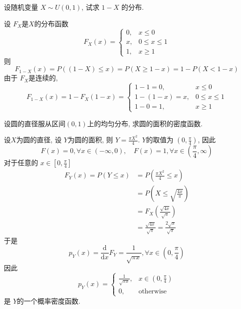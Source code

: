 \documentclass[../main.tex]{subfiles}
\begin{document}
\begin{exercise}{}{}
设随机变量 $X \sim U(0,1)$, 试求 $1-X$ 的分布.
\end{exercise}
\begin{solution}
   设 \(  F_{X}  \)是\(  X  \)的分布函数\[
   F_{X}\left( x \right)= \begin{cases} 0,& x \le 0\\ 
    x,& 0\le x\le 1\\ 
     1,& x\ge 1 \end{cases}  
   \] 则   \[
 F_{1-X}\left( x \right)=   P\left( \left( 1-X \right)\le x  \right)= P\left( X\ge 1-x \right)= 1-P\left( X< 1-x \right)   
  \]由于 \( F_{X}  \)是连续的, \[
  F_{1-X}\left( x \right)= 1- F_{X}\left( 1-x \right)  = \begin{cases} 1-1= 0,&x\le 0\\ 
   1-\left( 1-x \right)= x,& 0\le x\le 1\\ 
    1-0=  1,& x\ge 1  \end{cases} 
  \]
\end{solution}

\begin{exercise}{}{}
设圆的直径服从区间$(0,1)$上的均匀分布, 求圆的面积的密度函数.
\end{exercise}
\begin{solution}
  设\(  X  \)为圆的直径, 设 \(  Y  \)为圆的面积, 则 \(  Y= \frac{ \pi X^{2} }{4 }   \).  \(  Y  \)的取值为 \(  \left( 0, \frac{ \pi  }{4 }  \right)   \), 因此 \[
  F\left( x \right)= 0, \forall  x\in \left( -\infty,0 \right)  ,\quad F\left( x \right)= 1, \forall x \in \left( \frac{ \pi  }{4 },\infty  \right)  
  \] 对于任意的 \(  x\in [0,\frac{ \pi  }{4 } ]  \)  \[
 \begin{aligned}
  F_{Y}\left( x \right)= P\left( Y\le x \right)&= P\left( \frac{ \pi X^{2} }{4 }\le x  \right)   \\ 
   &= P\left( X\le \sqrt{\frac{4x }{ \pi  } } \right) \\ 
    &= F_{X}\left( \frac{\sqrt{4x} }{\sqrt{ \pi }  }  \right) \\ 
     &= \frac{\sqrt{4x} }{ \sqrt{ \pi }  } = \frac{2 \sqrt{x} }{ \sqrt{ \pi }  } 
 \end{aligned}
  \]   于是 \[
  p_{Y}\left( x \right)= \frac{\mathrm{d}}{\mathrm{d}x} F_{Y}= \frac{1 }{\sqrt{ \pi x} },\forall x\in \left( 0,\frac{ \pi  }{4 }  \right)  
  \] 因此 \[
  p_{Y}\left( x \right)= \begin{cases} \frac{1 }{\sqrt{ \pi x} }, &x\in \left( 0,\frac{ \pi  }{4 }  \right)   \\ 
   0,& \text{otherwise}\end{cases}  
  \]是 \(  Y  \)的一个概率密度函数. 
\end{solution}
\end{document}
